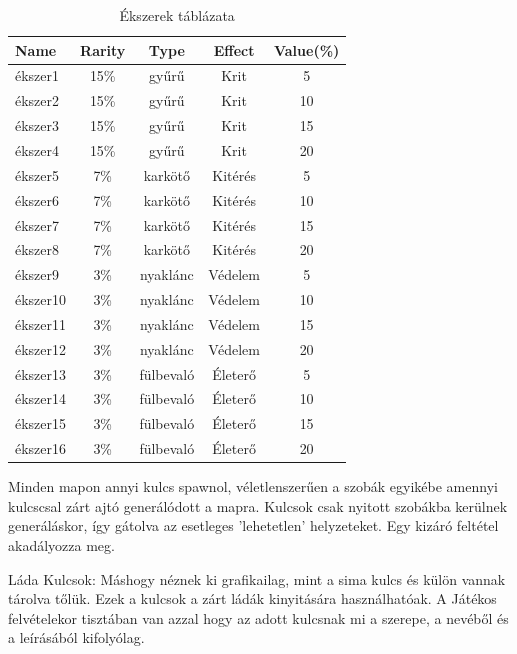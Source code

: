 \begin{table}[H]
\centering
\caption{Ékszerek táblázata}
\label{tab:minta}
\begin{tabular}{|l|c|c|c|c|}
\hline
 Name & Rarity & Type & Effect & Value(\%) \\
\hline
 ékszer1 & 15\% & gyűrű & Krit & 5 \\
\hline
 ékszer2 & 15\% & gyűrű & Krit & 10 \\
\hline
 ékszer3 & 15\% & gyűrű & Krit & 15\\
\hline
 ékszer4 & 15\% & gyűrű & Krit  & 20\\
\hline
 ékszer5 & 7\% & karkötő & Kitérés & 5 \\
\hline
 ékszer6 & 7\% & karkötő & Kitérés & 10 \\
\hline
 ékszer7 & 7\% & karkötő & Kitérés & 15\\
\hline
 ékszer8 & 7\% & karkötő & Kitérés  & 20\\
 \hline
 ékszer9 & 3\% & nyaklánc & Védelem & 5 \\
\hline
 ékszer10 & 3\% & nyaklánc & Védelem & 10 \\
\hline
 ékszer11 & 3\% & nyaklánc & Védelem & 15\\
\hline
 ékszer12 & 3\% & nyaklánc & Védelem  & 20\\
 \hline
 ékszer13 & 3\% & fülbevaló & Életerő & 5 \\
\hline
 ékszer14 & 3\% & fülbevaló & Életerő & 10 \\
\hline
 ékszer15 & 3\% & fülbevaló & Életerő & 15\\
\hline
 ékszer16 & 3\% & fülbevaló & Életerő  & 20\\
 \hline
\end{tabular}
\end{table}

\newpage


Minden mapon annyi kulcs spawnol, véletlenszerűen a szobák egyikébe amennyi kulcs\-csal zárt ajtó generálódott a mapra.
Kulcsok csak nyitott szobákba kerülnek generáláskor, így gátolva az esetleges 'lehetetlen' helyzeteket. Egy kizáró feltétel akadályozza meg.

Láda Kulcsok:
Máshogy néznek ki grafikailag, mint a sima kulcs és külön vannak tárolva tőlük. Ezek a kulcsok a zárt ládák kinyitására használhatóak.
A Játékos felvételekor tisztában van azzal hogy az adott kulcsnak mi a szerepe, a nevéből és a leírásából kifolyólag.


